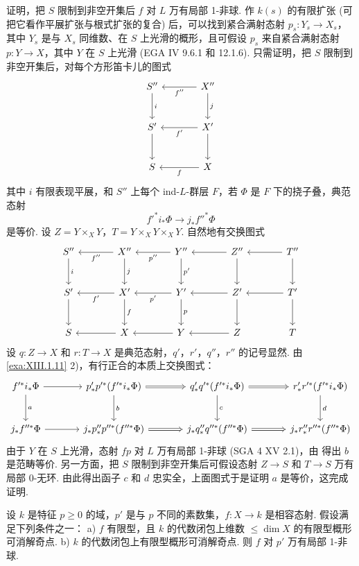 证明，把 $S$ 限制到非空开集后 $f$ 对 $L$ 万有局部 1-非球. 作 $k(s)$ 的有限扩张 (可把它看作平展扩张与根式扩张的复合) 后，可以找到紧合满射态射 $p_s \colon Y_s \to X_s$，其中 $Y_s$ 是与 $X_s$ 同维数、在 $S$ 上光滑的概形，且可假设 $p_s$ 来自紧合满射态射 $p \colon Y \to X$，其中 $Y$ 在 $S$ 上光滑 (EGA IV 9.6.1 和 12.1.6). 只需证明，把 $S$ 限制到非空开集后，对每个方形笛卡儿的图式
\[
\begin{tikzcd}[row sep=large, column sep=large]
S'' \arrow[d,"{i}"] & X'' \arrow[l,"{f''}"] \arrow[d,"{j}"] \\
S' \arrow[d] & X' \arrow[l,"{f'}"] \arrow[d] \\
S & X \arrow[l,"{f}"]
\end{tikzcd}
\]
其中 $i$ 有限表现平展，和 $S''$ 上每个 ind-$L$-群层 $F$，若 $\Phi$ 是 $F$ 下的挠子叠，典范态射
\[
f'^{*} i_* \Phi \longrightarrow j_* f''^{*} \Phi
\]
是等价. 设 $Z = Y \times_X Y$，$T = Y \times_X Y \times_X Y$. 自然地有交换图式
\[
\begin{tikzcd}[row sep=large, column sep=large]
S'' \arrow[d,"{i}"] & X'' \arrow[l,"{f''}"] \arrow[d,"{j}"] & Y'' \arrow[l,"{p''}"] \arrow[d,"{p'}"] & Z'' \arrow[l] \arrow[d] & T'' \arrow[l] \arrow[d] \\
S' \arrow[d] & X' \arrow[l,"{f'}"] \arrow[d,"{f}"] & Y' \arrow[l,"{p'}"] \arrow[d,"{p}"] & Z' \arrow[l] \arrow[d] & T' \arrow[l] \arrow[d] \\
S & X \arrow[l] & Y \arrow[l] & Z \arrow[l] & T
\end{tikzcd}
\]
设 $q \colon Z \to X$ 和 $r \colon T \to X$ 是典范态射，$q'$，$r'$，$q''$，$r''$ 的记号显然. 由 \ref{exa:XIII.1.11} 2)，有行正合的本质上交换图式：
\[
\begin{tikzcd}[row sep=large, column sep=large]
f'^{*} i_* \Phi \arrow[r] \arrow[d,"{a}"] & p'_* p'^{*}(f'^{*} i_* \Phi) \arrow[r, Rightarrow] \arrow[d,"{b}"] & q'_* q'^{*}(f'^{*} i_* \Phi) \arrow[r, Rightarrow] \arrow[d,"{c}"] & r'_* r'^{*}(f'^{*} i_* \Phi) \arrow[d,"{d}"] \\
j_* f''^{*} \Phi \arrow[r] & j_* p''_* p''^{*}(f''^{*} \Phi) \arrow[r, Rightarrow] & j_* q''_* q''^{*}(f''^{*} \Phi) \arrow[r, Rightarrow] & j_* r''_* r''^{*}(f''^{*} \Phi)
\end{tikzcd}
\]
由于 $Y$ 在 $S$ 上光滑，态射 $fp$ 对 $L$ 万有局部 1-非球 (SGA 4 XV 2.1)，由 \cite[VII 2.1.7]{exp13-2} 得出 $b$ 是范畴等价. 另一方面，把 $S$ 限制到非空开集后可假设态射 $Z \to S$ 和 $T \to S$ 万有局部 0-无环. 由此得出函子 $c$ 和 $d$ 忠实全，上面图式于是证明 $a$ 是等价，这完成证明.

\begin{corollary}\label{cor:XIII.3.4}
设 $k$ 是特征 $p \geqslant 0$ 的域，$p'$ 是与 $p$ 不同的素数集，$f \colon X \to k$ 是相容态射. 假设满足下列条件之一：
a) $f$ 有限型，且 $k$ 的代数闭包上维数 $\leqslant \dim X$ 的有限型概形可消解奇点.
b) $k$ 的代数闭包上有限型概形可消解奇点.
则 $f$ 对 $p'$ 万有局部 1-非球.
\end{corollary}

